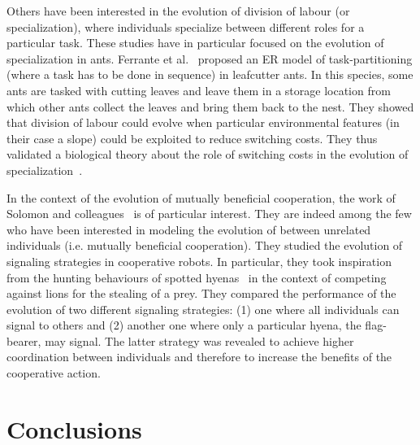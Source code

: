         Others have been interested in the evolution of division of labour (or specialization), where individuals specialize between different roles for a particular task. These studies have in particular focused on the evolution of specialization in ants. Ferrante et al.~\parencite{Ferrante2015} proposed an ER model of task-partitioning (where a task has to be done in sequence) in leafcutter ants. In this species, some ants are tasked with cutting leaves and leave them in a storage location from which other ants collect the leaves and bring them back to the nest. They showed that division of labour could evolve when particular environmental features (in their case a slope) could be exploited to reduce switching costs. They thus validated a biological theory about the role of switching costs in the evolution of specialization~\parencite{Duarte2011}. 


        In the context of the evolution of mutually beneficial cooperation, the work of Solomon and colleagues~\parencite{Solomon2012} is of particular interest. They are indeed among the few who have been interested in modeling the evolution of between unrelated individuals (i.e. mutually beneficial cooperation). They studied the evolution of signaling strategies in cooperative robots. In particular, they took inspiration from the hunting behaviours of spotted hyenas~\parencite{Smith2012a} in the context of competing against lions for the stealing of a prey. They compared the performance of the evolution of two different signaling strategies: (1) one where all individuals can signal to others and (2) another one where only a particular hyena, the flag-bearer, may signal. The latter strategy was revealed to achieve higher coordination between individuals and therefore to increase the benefits of the cooperative action.


\section{Conclusions}


